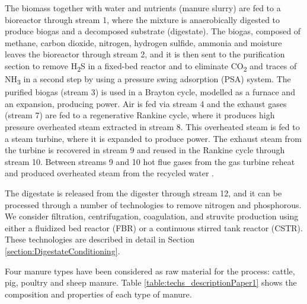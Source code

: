 \begin{refsection}[referencesCh2]
The biomass together with water and nutrients (manure slurry) are fed to a bioreactor through stream 1, where the mixture is anaerobically digested to produce biogas and a decomposed substrate (digestate). The biogas, composed of methane, carbon dioxide, nitrogen, hydrogen sulfide, ammonia and moisture leaves the bioreactor through stream 2, and it is then sent to the purification section to remove H\textsubscript{2}S in a fixed-bed reactor and to eliminate CO\textsubscript{2} and traces of NH\textsubscript{3} in a second step by using a pressure swing adsorption (PSA) system. The purified biogas (stream 3) is used in a Brayton cycle, modelled as a furnace and an expansion, producing power. Air is fed via stream 4 and the exhaust gases (stream 7) are fed to a regenerative Rankine cycle, where it produces high pressure overheated steam extracted in stream 8. This overheated steam is fed to a steam turbine, where it is expanded to produce power. The exhaust steam from the turbine is recovered in stream 9 and reused in the Rankine cycle through stream 10. Between streams 9 and 10 hot flue gases from the gas turbine reheat and produced overheated steam from the recycled water \citep{Leon}.

The digestate is released from the digester through stream 12, and it can be processed through a number of technologies to remove nitrogen and phosphorous. We consider filtration, centrifugation, coagulation, and struvite production using either a fluidized bed reactor (FBR) or a continuous stirred tank reactor (CSTR). These technologies are described in detail in Section \ref{section:DigestateConditioning}.

Four manure types have been considered as raw material for the process: cattle, pig, poultry and sheep manure. Table \ref{table:techs_descriptionPaper1} shows the composition and properties of each type of manure.


\end{refsection}

